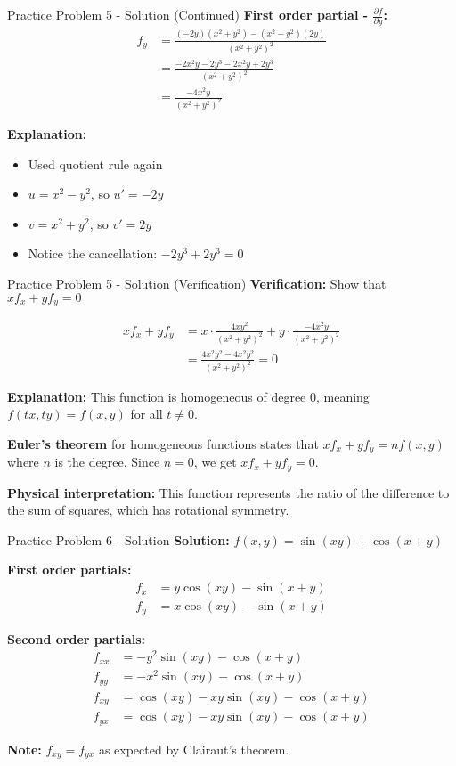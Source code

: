 \documentclass[aspectratio=169]{beamer}
\begin{document}
\begin{frame}{Practice Problem 5 - Solution (Continued)}
\textbf{First order partial - $\frac{\partial f}{\partial y}$:}
\begin{align*}
    f_y &= \frac{(-2y)(x^2 + y^2) - (x^2 - y^2)(2y)}{(x^2 + y^2)^2} \\
    &= \frac{-2x^2y - 2y^3 - 2x^2y + 2y^3}{(x^2 + y^2)^2} \\
    &= \frac{-4x^2y}{(x^2 + y^2)^2}
\end{align*}

\textbf{Explanation:}
\begin{itemize}
    \item Used quotient rule again
    \item $u = x^2 - y^2$, so $u' = -2y$
    \item $v = x^2 + y^2$, so $v' = 2y$
    \item Notice the cancellation: $-2y^3 + 2y^3 = 0$
\end{itemize}
\end{frame}

\begin{frame}{Practice Problem 5 - Solution (Verification)}
\textbf{Verification:} Show that $xf_x + yf_y = 0$

\begin{align*}
    xf_x + yf_y &= x \cdot \frac{4xy^2}{(x^2 + y^2)^2} + y \cdot \frac{-4x^2y}{(x^2 + y^2)^2} \\
    &= \frac{4x^2y^2 - 4x^2y^2}{(x^2 + y^2)^2} = 0
\end{align*}

\textbf{Explanation:} This function is homogeneous of degree 0, meaning $f(tx, ty) = f(x,y)$ for all $t \neq 0$. 

\textbf{Euler's theorem} for homogeneous functions states that $xf_x + yf_y = nf(x,y)$ where $n$ is the degree. Since $n = 0$, we get $xf_x + yf_y = 0$.

\textbf{Physical interpretation:} This function represents the ratio of the difference to the sum of squares, which has rotational symmetry.
\end{frame}

\begin{frame}{Practice Problem 6 - Solution}
\textbf{Solution:} $f(x,y) = \sin(xy) + \cos(x + y)$

\textbf{First order partials:}
\begin{align*}
    f_x &= y\cos(xy) - \sin(x + y) \\
    f_y &= x\cos(xy) - \sin(x + y)
\end{align*}

\textbf{Second order partials:}
\begin{align*}
    f_{xx} &= -y^2\sin(xy) - \cos(x + y) \\
    f_{yy} &= -x^2\sin(xy) - \cos(x + y) \\
    f_{xy} &= \cos(xy) - xy\sin(xy) - \cos(x + y) \\
    f_{yx} &= \cos(xy) - xy\sin(xy) - \cos(x + y)
\end{align*}

\textbf{Note:} $f_{xy} = f_{yx}$ as expected by Clairaut's theorem.
\end{frame}
\end{document}
